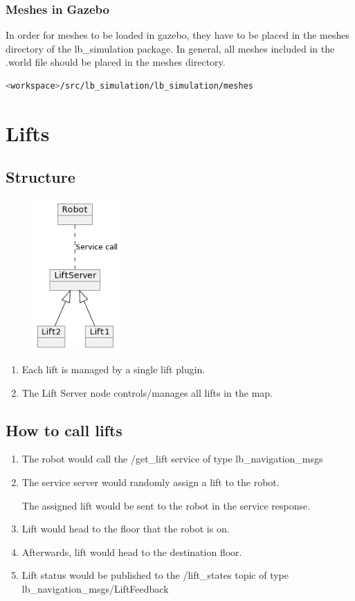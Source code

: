 \documentclass[11pt]{article}
\begin{document}
\subsubsection{Meshes in Gazebo}
In order for meshes to be loaded in gazebo, they have to be placed in the meshes directory
of the lb\_simulation package. In general, all meshes included in the .world file should be placed in the meshes directory.
\begin{lstlisting}[language=bash]
<workspace>/src/lb_simulation/lb_simulation/meshes
\end{lstlisting}
\section{Lifts}
\subsection{Structure}
\begin{figure}[H]
 \centering
 \includegraphics[width=0.3\textwidth]{images/LiftServer}
\end{figure}
\begin{enumerate}
 \item Each lift is managed by a single lift plugin.
 \item The Lift Server node controls/manages all lifts in the map.
\end{enumerate}
\subsection{How to call lifts}
\begin{enumerate}
 \item {
       The robot would call the /get\_lift service of type lb\_navigation\_msgs
       }
 \item {
       The service server would randomly assign a lift to the robot.

       The assigned lift would be sent to the robot in the service response.
       }
 \item  Lift would head to the floor that the robot is on.
 \item  Afterwards, lift would head to the destination floor.
 \item  Lift status would be published to the /lift\_states topic of type lb\_navigation\_msgs/LiftFeedback
\end{enumerate}
\end{document}
